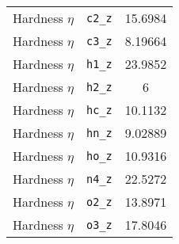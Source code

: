 \begin{table}[ht]
\begin{tabular}{lcc}
Hardness $\eta$ & \verb^c2_z^ & 15.6984 \\ 
Hardness $\eta$ & \verb^c3_z^ & 8.19664 \\ 
Hardness $\eta$ & \verb^h1_z^ & 23.9852 \\ 
Hardness $\eta$ & \verb^h2_z^ & 6 \\ 
Hardness $\eta$ & \verb^hc_z^ & 10.1132 \\ 
Hardness $\eta$ & \verb^hn_z^ & 9.02889 \\ 
Hardness $\eta$ & \verb^ho_z^ & 10.9316 \\ 
Hardness $\eta$ & \verb^n4_z^ & 22.5272 \\ 
Hardness $\eta$ & \verb^o2_z^ & 13.8971 \\ 
Hardness $\eta$ & \verb^o3_z^ & 17.8046 \\ 
\hline
\end{tabular}
\end{table}
